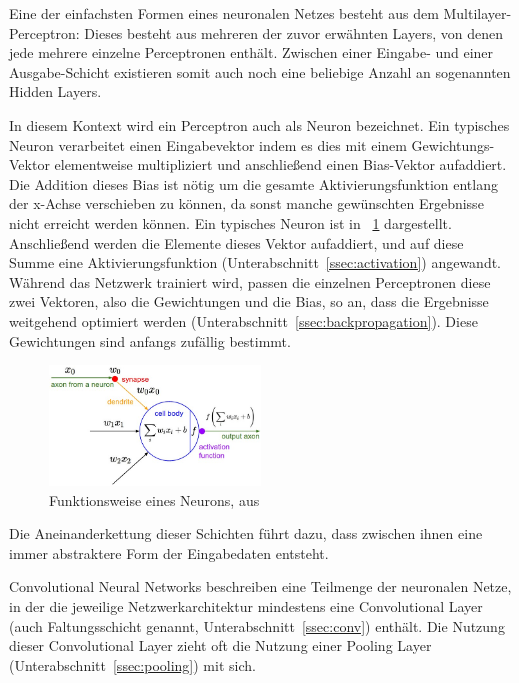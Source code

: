 Eine der einfachsten Formen eines neuronalen Netzes besteht aus dem Multilayer-Perceptron: Dieses besteht aus mehreren der zuvor erwähnten Layers, von denen jede mehrere einzelne Perceptronen enthält. Zwischen einer Eingabe- und einer Ausgabe-Schicht existieren somit auch noch eine beliebige Anzahl an sogenannten Hidden Layers.

In diesem Kontext wird ein Perceptron auch als Neuron bezeichnet. Ein typisches Neuron verarbeitet einen Eingabevektor indem es dies mit einem Gewichtungs-Vektor elementweise multipliziert und anschließend einen Bias-Vektor aufaddiert. Die Addition dieses Bias ist nötig um die gesamte Aktivierungsfunktion entlang der x-Achse verschieben zu können, da sonst manche gewünschten Ergebnisse nicht erreicht werden können. \cite{bias} Ein typisches Neuron ist in \figurename~\ref{fig:neuron} dargestellt. Anschließend werden die Elemente dieses Vektor aufaddiert, und auf diese Summe eine Aktivierungsfunktion (\vgl Unterabschnitt~\ref{ssec:activation}) angewandt. Während das Netzwerk trainiert wird, passen die einzelnen Perceptronen diese zwei Vektoren, also die Gewichtungen und die Bias, so an, dass die Ergebnisse weitgehend optimiert werden (\vgl Unterabschnitt~\ref{ssec:backpropagation}). Diese Gewichtungen sind anfangs zufällig bestimmt. \cite{hardesty_17, cs231n} 

\begin{figure}[h!]
	\centering
	\includegraphics[width=0.5\textwidth,keepaspectratio]{images/cs231n/neuron.jpg}
	\caption{Funktionsweise eines Neurons, aus \cite{cs231n}}
	\label{fig:neuron}
\end{figure}

Die Aneinanderkettung dieser Schichten führt dazu, dass zwischen ihnen eine immer abstraktere Form der Eingabedaten entsteht.

Convolutional Neural Networks beschreiben eine Teilmenge der neuronalen Netze, in der die jeweilige Netzwerkarchitektur mindestens eine Convolutional Layer (auch Faltungsschicht genannt, \vgl Unterabschnitt~\ref{ssec:conv}) enthält. Die Nutzung dieser Convolutional Layer zieht oft die Nutzung einer Pooling Layer (Unterabschnitt~\ref{ssec:pooling}) mit sich. \cite{deeplearning_16}

